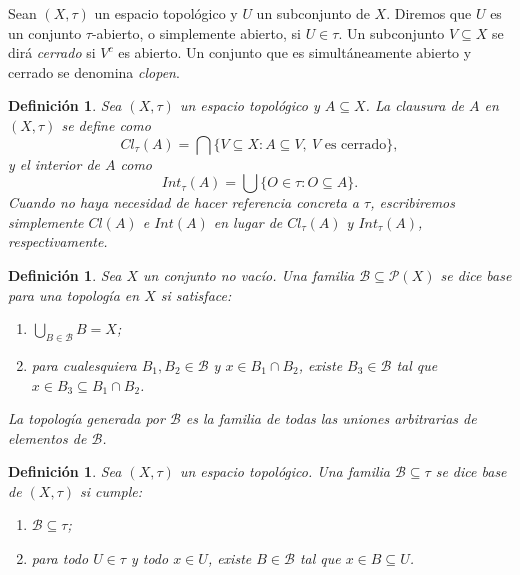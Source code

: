 \documentclass[12pt]{book}
\newtheorem{definition}[theorem]{Definición}
\begin{document}
Sean $(X,\tau)$ un espacio topológico y $U$ un subconjunto de $X$. Diremos que $U$ es un conjunto $\tau$-abierto, o simplemente abierto, si  \( U \in \tau \).  Un subconjunto \( V\subseteq X \) se dirá \emph{cerrado} si \( V^{c}\) es abierto. Un conjunto que es simultáneamente abierto y cerrado se denomina \emph{clopen}.

\begin{definition}\label{def:clausura-interior}
Sea \( (X,\tau) \) un espacio topológico y \( A\subseteq X \).
La \emph{clausura} de \( A \) en \( (X,\tau) \) se define como
\[
Cl_{\tau}(A)
   = \bigcap \{V \subseteq X : A\subseteq V,\ V \text{ es cerrado}\},
\]
y el \emph{interior} de \( A \) como
\[
Int_{\tau}(A)
   = \bigcup \{O\in\tau : O\subseteq A\}.
\]
Cuando no haya necesidad de hacer
referencia concreta a $\tau$, escribiremos simplemente \( Cl(A) \) e \( Int(A) \) en lugar de $Cl_{\tau}(A)$ y $Int_{\tau}(A)$, respectivamente.
\end{definition}

\begin{definition}\label{def:base-generadora}
Sea $X$ un conjunto no vacío. Una familia $\mathcal{B}\subseteq\mathcal{P}(X)$
se dice \emph{base} para una topología en $X$ si satisface:

\begin{enumerate}
  \item $\displaystyle \bigcup_{B\in\mathcal{B}} B = X$;
  \item para cualesquiera $B_1,B_2\in\mathcal{B}$ y $x\in B_1\cap B_2$,
        existe $B_3\in\mathcal{B}$ tal que $x\in B_3\subseteq B_1\cap B_2$.
\end{enumerate}

La \emph{topología generada por $\mathcal{B}$} es la familia de todas
las uniones arbitrarias de elementos de $\mathcal{B}$.
\end{definition}

\begin{definition}\label{def:base-espacio}
Sea $(X,\tau)$ un espacio topológico. Una familia
$\mathcal{B}\subseteq\tau$ se dice \emph{base de $(X,\tau)$} si cumple:

\begin{enumerate}
  \item $\mathcal{B}\subseteq\tau$;
  \item para todo $U\in\tau$ y todo $x\in U$,
        existe $B\in\mathcal{B}$ tal que $x\in B\subseteq U$.
\end{enumerate}
\end{definition}
\end{document}

